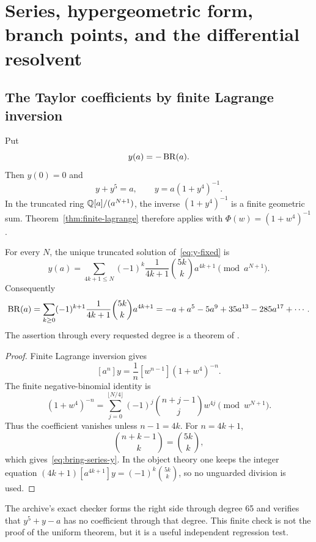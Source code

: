\section{Series, hypergeometric form, branch points, and the differential resolvent}\label{sec:series}

\subsection{The Taylor coefficients by finite Lagrange inversion}

Put
\[
 y(a)=-\operatorname{BR}(a).
\]
Then \(y(0)=0\) and
\begin{equation}\label{eq:y-fixed}
 y+y^5=a,
 \qquad
 y=a(1+y^4)^{-1}.
\end{equation}
In the truncated ring \(\mathbb Q[a]/(a^{N+1})\), the inverse
\((1+y^4)^{-1}\) is a finite geometric sum.  Theorem~\ref{thm:finite-lagrange}
therefore applies with \(\Phi(w)=(1+w^4)^{-1}\).

\begin{theorem}\label{thm:bring-coeff}
For every \(N\), the unique truncated solution of~\eqref{eq:y-fixed} is
\begin{equation}\label{eq:bring-series-y}
 y(a)=\sum_{4k+1\le N}
 (-1)^k\frac{1}{4k+1}\binom{5k}{k}a^{4k+1}
 \pmod {a^{N+1}}.
\end{equation}
Consequently
\begin{equation}\label{eq:bring-series}
 \operatorname{BR}(a)=\sum_{k\ge0}
 (-1)^{k+1}\frac{1}{4k+1}\binom{5k}{k}a^{4k+1}
 =-a+a^5-5a^9+35a^{13}-285a^{17}+\cdots .
\end{equation}
The assertion through every requested degree is a theorem of \ipra.
\end{theorem}

\begin{proof}
Finite Lagrange inversion gives
\[
 [a^n]y=\frac1n[w^{n-1}](1+w^4)^{-n}.
\]
The finite negative-binomial identity is
\[
 (1+w^4)^{-n}
 =\sum_{j=0}^{\lfloor N/4\rfloor}
   (-1)^j\binom{n+j-1}{j}w^{4j}
   \pmod {w^{N+1}}.
\]
Thus the coefficient vanishes unless \(n-1=4k\).  For
\(n=4k+1\),
\[
 \binom{n+k-1}{k}=\binom{5k}{k},
\]
which gives~\eqref{eq:bring-series-y}.  In the object theory one keeps the
integer equation
\((4k+1)[a^{4k+1}]y=(-1)^k\binom{5k}{k}\), so no unguarded division is used.
\end{proof}

The archive's exact checker forms the right side through degree 65 and verifies
that \(y^5+y-a\) has no coefficient through that degree.  This finite check is
not the proof of the uniform theorem, but it is a useful independent regression
test.


